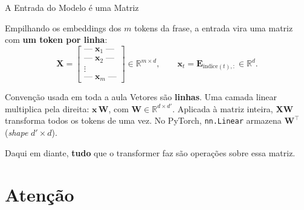 \documentclass[aspectratio=169,xcolor=dvipsnames]{beamer}
\begin{document}
\begin{frame}{A Entrada do Modelo é uma Matriz}

Empilhando os embeddings dos $m$ tokens da frase, a entrada vira uma matriz com \textbf{um token por linha}:
\[
\mathbf{X} =
\begin{bmatrix}
\text{---}\; \mathbf{x}_1 \;\text{---} \\
\text{---}\; \mathbf{x}_2 \;\text{---} \\
\vdots \\
\text{---}\; \mathbf{x}_m \;\text{---}
\end{bmatrix}
\in \mathbb{R}^{m \times d},
\qquad \mathbf{x}_t = \mathbf{E}_{\text{índice}(t),:} \in \mathbb{R}^{d}.
\]

\vspace{6pt}

\begin{block}{Convenção usada em toda a aula}
Vetores são \textbf{linhas}. Uma camada linear multiplica pela direita: $\mathbf{x}\,\mathbf{W}$, com $\mathbf{W} \in \mathbb{R}^{d \times d'}$. Aplicada à matriz inteira, $\mathbf{X}\mathbf{W}$ transforma todos os tokens de uma vez. No PyTorch, \texttt{nn.Linear} armazena $\mathbf{W}^{\top}$ (\textit{shape} $d' \times d$).
\end{block}

\vspace{6pt}

\centering
Daqui em diante, \textbf{tudo} que o transformer faz são operações sobre essa matriz.

\end{frame}

\section{Atenção}
\end{document}
